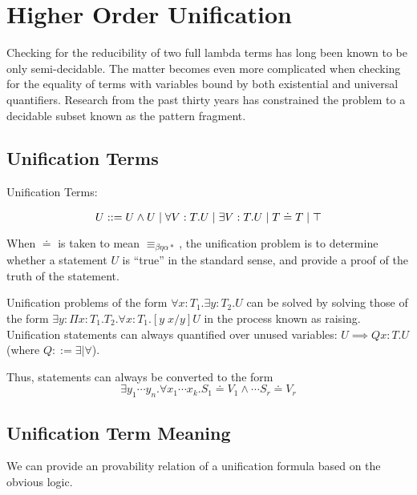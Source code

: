\section{Higher Order Unification}

Checking for the reducibility of two full lambda terms has long been known to be only semi-decidable.
The matter becomes even more complicated when checking for the equality of terms with variables bound
by both existential and universal quantifiers.  Research from the past thirty years has constrained
the problem to a decidable subset known as the pattern fragment.

\subsection{Unification Terms}

\begin{definition}
Unification Terms:

\[
U ::= U \wedge U 
 \; | \; \forall V : T . U
 \; | \; \exists V : T . U 
 \; | \; T \doteq T
 \; | \; \top
\]
\label{def:hou:syn}
\end{definition}

When $\doteq$ is taken to mean $\equiv_{\beta\eta\alpha*}$, the unification problem is to determine 
whether a statement $U$ is ``true'' in the standard sense, and provide a proof of the truth of the statement. 

Unification problems of the form 
$\forall x : T_1 . \exists y : T_2 . U $ can be solved by solving those of the form
$\exists y : \Pi x : T_1 . T_2 . \forall x : T_1 . [y\; x / y ]U $ 
in the process known as raising. 
Unification statements can always quantified over unused variables: $U \implies Q x : T . U$ (where $Q ::= \exists | \forall $).  

Thus, statements can always be converted to the form
\[
\exists y_1 \cdots y_n . \forall x_1 \cdots x_k . S_1 \doteq V_1 \wedge \cdots S_r \doteq V_r
\]




\subsection{Unification Term Meaning}

We can provide an provability relation of a unification formula
based on the obvious logic.

